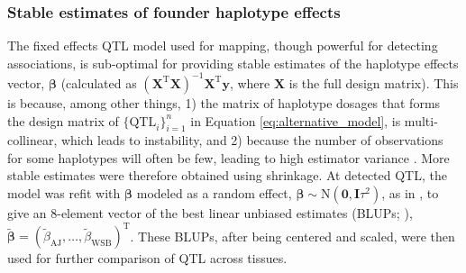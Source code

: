 \documentclass[9pt,twocolumn,twoside]{gsajnl}
\newcommand{\T}{^\mathrm{T}}
\newcommand{\bbeta}{\boldsymbol{\beta}}
\newcommand{\blup}{\widetilde{\bbeta}}
\newcommand{\bzero}{\mathbf{0}}
\newcommand{\bI}{\mathbf{I}}
\newcommand{\bx}{\mathbf{x}}
\newcommand{\bX}{\mathbf{X}}
\newcommand{\by}{\mathbf{y}}
\newcommand{\tausq}{\tau^{2}}
\newcommand{\WV}[2]{\textcolor{red}{#1\footnote{\textcolor{red}{WV: #2}}}}
\begin{document}
\subsubsection{Stable estimates of founder haplotype effects} 
The fixed effects QTL model used for mapping, though powerful for detecting associations, is sub-optimal for providing stable estimates of the haplotype effects vector, $\bbeta$ (calculated as $(\bX^{\text{T}}\bX)^{-1}\bX^{\text{T}}\by$, where $\bX$ is the full design matrix). This is because, among other things, 1) the matrix of haplotype dosages that forms the design matrix of $\{\text{QTL}_i\}^n_{i=1}$ in Equation \ref{eq:alternative_model}, is multi-collinear, which leads to instability, and 2) because the number of observations for some haplotypes will often be few, leading to high estimator variance \citep{Zhang2014}. More stable estimates were therefore obtained using shrinkage. At detected QTL, the model was refit with $\bbeta$ modeled as a random effect, $\bbeta \sim \text{N}(\bzero, \bI\tausq)$, as in \cite{Wei2016}, to give an 8-element vector of the best linear unbiased estimates (BLUPs; \citet{Robinson1991}), $\blup=(\widetilde{\beta}_\text{AJ},\dots,\widetilde{\beta}_\text{WSB})\T$. These BLUPs, after being centered and scaled, were then used for further comparison of QTL across tissues. 

\end{document}
